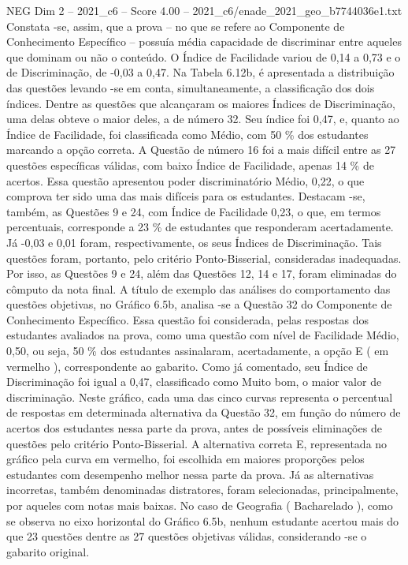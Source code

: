 \begin{textsample}{NEG Dim 2 – 2021\_c6 – Score 4.00 – 2021\_c6/enade\_2021\_geo\_b7744036e1.txt}
Constata -se, assim, que a prova – no que se refere ao Componente de Conhecimento Específico – possuía média capacidade de discriminar entre aqueles que dominam ou não o conteúdo.
O Índice de Facilidade variou de 0,14 a 0,73 e o de Discriminação, de -0,03 a 0,47.
Na Tabela 6.12b, é apresentada a distribuição das questões levando -se em conta, simultaneamente, a classificação dos dois índices.
Dentre as questões que alcançaram os maiores Índices de Discriminação, uma delas obteve o maior deles, a de número 32.
Seu índice foi 0,47, e, quanto ao Índice de Facilidade, foi classificada como Médio, com 50 \% dos estudantes marcando a opção correta.
A Questão de número 16 foi a mais difícil entre as 27 questões específicas válidas, com baixo Índice de Facilidade, apenas 14 \% de acertos.
Essa questão apresentou poder discriminatório Médio, 0,22, o que comprova ter sido uma das mais difíceis para os estudantes.
Destacam -se, também, as Questões 9 e 24, com Índice de Facilidade 0,23, o que, em termos percentuais, corresponde a 23 \% de estudantes que responderam acertadamente.
Já -0,03 e 0,01 foram, respectivamente, os seus Índices de Discriminação.
Tais questões foram, portanto, pelo critério Ponto-Bisserial, consideradas inadequadas.
Por isso, as Questões 9 e 24, além das Questões 12, 14 e 17, foram eliminadas do cômputo da nota final.
A título de exemplo das análises do comportamento das questões objetivas, no Gráfico 6.5b, analisa -se a Questão 32 do Componente de Conhecimento Específico.
Essa questão foi considerada, pelas respostas dos estudantes avaliados na prova, como uma questão com nível de Facilidade Médio, 0,50, ou seja, 50 \% dos estudantes assinalaram, acertadamente, a opção E ( em vermelho ), correspondente ao gabarito.
Como já comentado, seu Índice de Discriminação foi igual a 0,47, classificado como Muito bom, o maior valor de discriminação.
Neste gráfico, cada uma das cinco curvas representa o percentual de respostas em determinada alternativa da Questão 32, em função do número de acertos dos estudantes nessa parte da prova, antes de possíveis eliminações de questões pelo critério Ponto-Bisserial.
A alternativa correta E, representada no gráfico pela curva em vermelho, foi escolhida em maiores proporções pelos estudantes com desempenho melhor nessa parte da prova.
Já as alternativas incorretas, também denominadas distratores, foram selecionadas, principalmente, por aqueles com notas mais baixas.
No caso de Geografia ( Bacharelado ), como se observa no eixo horizontal do Gráfico 6.5b, nenhum estudante acertou mais do que 23 questões dentre as 27 questões objetivas válidas, considerando -se o gabarito original.

\end{textsample}
